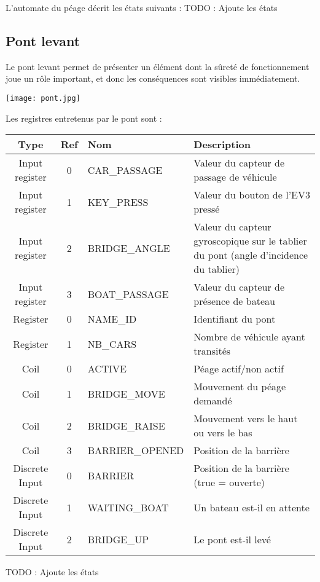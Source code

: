 \documentclass[10pt,a4paper]{article}
\begin{document}
L'automate du péage décrit les états suivants :
TODO : Ajoute les états

\subsection{Pont levant}
Le pont levant permet de présenter un élément dont la sûreté de fonctionnement joue un r\^ole important, et donc les conséquences sont visibles immédiatement.

\begin{center}
\texttt{[image: pont.jpg]}
\end{center}

Les registres entretenus par le pont sont :

\begin{tabular}{|c|c|l|l|}
\hline 
\textbf{Type} & \textbf{Ref} & \textbf{Nom} & \textbf{Description} \\ 
\hline 
Input register & 0 & CAR\_PASSAGE & Valeur du capteur de passage de véhicule \\ 
\hline 
Input register & 1 & KEY\_PRESS & Valeur du bouton de l'EV3 pressé \\ 
\hline 
Input register & 2 & BRIDGE\_ANGLE & Valeur du capteur gyroscopique sur le tablier du pont (angle d'incidence du tablier) \\ 
\hline 
Input register & 3 & BOAT\_PASSAGE & Valeur du capteur de présence de bateau \\ 
\hline 
Register & 0 & NAME\_ID & Identifiant du pont \\ 
\hline 
Register & 1 & NB\_CARS & Nombre de véhicule ayant transités \\ 
\hline 
Coil & 0 & ACTIVE & Péage actif/non actif \\ 
\hline 
Coil & 1 & BRIDGE\_MOVE & Mouvement du péage demandé \\ 
\hline 
Coil & 2 & BRIDGE\_RAISE & Mouvement vers le haut ou vers le bas \\
\hline 
Coil & 3 & BARRIER\_OPENED & Position de la barrière \\ 
\hline 
Discrete Input & 0 & BARRIER & Position de la barrière (true = ouverte) \\ 
\hline 
Discrete Input & 1 & WAITING\_BOAT & Un bateau est-il en attente \\ 
\hline 
Discrete Input & 2 & BRIDGE\_UP & Le pont est-il levé\\ 
\hline 
\end{tabular} 

TODO : Ajoute les états
\end{document}
